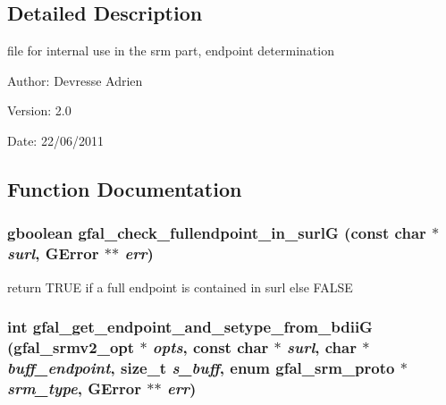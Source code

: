 \subsection{Detailed Description}
file for internal use in the srm part, endpoint determination 

\begin{Desc}
\item[Author:]Devresse Adrien \end{Desc}
\begin{Desc}
\item[Version:]2.0 \end{Desc}
\begin{Desc}
\item[Date:]22/06/2011 \end{Desc}


\subsection{Function Documentation}
\subsubsection{\setlength{\rightskip}{0pt plus 5cm}gboolean gfal\_\-check\_\-fullendpoint\_\-in\_\-surl\-G (const char $\ast$ {\em surl}, GError $\ast$$\ast$ {\em err})}\label{gfal__common__srm__endpoint_8c_99a6995d5d222d54f28d7952499f60ba}


return TRUE if a full endpoint is contained in surl else FALSE 
\subsubsection{\setlength{\rightskip}{0pt plus 5cm}int gfal\_\-get\_\-endpoint\_\-and\_\-setype\_\-from\_\-bdii\-G (gfal\_\-srmv2\_\-opt $\ast$ {\em opts}, const char $\ast$ {\em surl}, char $\ast$ {\em buff\_\-endpoint}, size\_\-t {\em s\_\-buff}, enum gfal\_\-srm\_\-proto $\ast$ {\em srm\_\-type}, GError $\ast$$\ast$ {\em err})}\label{gfal__common__srm__endpoint_8c_8ce7110e994216e73c28b439829b1d21}


